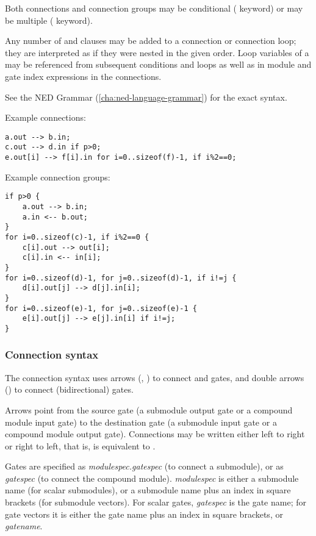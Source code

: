 Both connections and connection groups may be conditional (
keyword) or may be multiple ( keyword).

Any number of  and  clauses may be added to
a connection or connection loop; they are interpreted as if they were
nested in the given order. Loop variables of a  may be
referenced from subsequent conditions and loops as well as in module and
gate index expressions in the connections.

See the NED Grammar (\ref{cha:ned-language-grammar}) for the exact syntax.

Example connections:

\begin{verbatim}
a.out --> b.in;
c.out --> d.in if p>0;
e.out[i] --> f[i].in for i=0..sizeof(f)-1, if i%2==0;
\end{verbatim}

Example connection groups:

\begin{verbatim}
if p>0 {
    a.out --> b.in;
    a.in <-- b.out;
}
for i=0..sizeof(c)-1, if i%2==0 {
    c[i].out --> out[i];
    c[i].in <-- in[i];
}
for i=0..sizeof(d)-1, for j=0..sizeof(d)-1, if i!=j {
    d[i].out[j] --> d[j].in[i];
}
for i=0..sizeof(e)-1, for j=0..sizeof(e)-1 {
    e[i].out[j] --> e[j].in[i] if i!=j;
}
\end{verbatim}


\subsubsection{Connection syntax}

The connection syntax uses arrows (\ttt{-{}->}, \ttt{<-{}-}) to connect
 and  gates, and double arrows
(\ttt{<-{}->}) to connect  (bidirectional) gates.

Arrows point from the source gate (a submodule output gate or a compound
module input gate) to the destination gate (a submodule input gate or a
compound module output gate). Connections may be written either left to right
or right to left, that is,  is equivalent to .

Gates are specified as \textit{modulespec.gatespec} (to connect a submodule),
or as \textit{gatespec} (to connect the compound module). \textit{modulespec}
is either a submodule name (for scalar submodules), or a submodule name plus
an index in square brackets (for submodule vectors). For scalar gates,
\textit{gatespec} is the gate name; for gate vectors it is either the gate name
plus an index in square brackets, or \textit{gatename}\ttt{++}.

